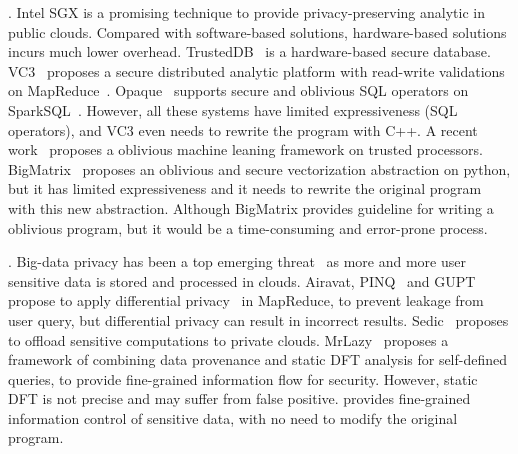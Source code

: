 . Intel SGX is a promising technique 
to provide privacy-preserving analytic in public clouds. Compared with 
software-based solutions, hardware-based solutions incurs much lower overhead. 
TrustedDB~\cite{trusteddb:sigmod11} is a hardware-based secure database.
VC3~\cite{vc3:sp15} proposes a secure distributed analytic platform
with read-write validations on MapReduce~\cite{mapreduce}. 
Opaque~\cite{opaque:nsdi17} supports secure and oblivious SQL operators on 
SparkSQL~\cite{sparksql:sigmod15}. However, all these systems have limited 
expressiveness (\eg SQL operators), and VC3 even needs to rewrite the program 
with C++. A recent work~\cite{oblivious:security16} proposes a oblivious 
machine leaning framework on trusted processors. 
BigMatrix~\cite{bigmatrix:ccs17} proposes an oblivious and secure vectorization
abstraction on python, but it has limited expressiveness and it needs to
rewrite the original program with this new abstraction. Although BigMatrix 
provides guideline for writing a oblivious program, but it would be a 
time-consuming and error-prone process.


. Big-data privacy has been a top 
emerging threat~\cite{top-threats-nine, kazim2015survey} as more and more user 
sensitive data is stored and processed in clouds. 
Airavat\cite{airavat:nsdi10}, PINQ~\cite{pinq:sigmod09} and 
GUPT~\cite{gupt:sigmod12} propose to apply differential 
privacy~\cite{noise:tcc06,differential:focs07} in MapReduce,
to prevent leakage from user query, but differential privacy can result in 
incorrect results. Sedic~\cite{sedic:cloud13} proposes to offload sensitive 
computations to private clouds. MrLazy~\cite{hotcloud14:mrlazy}
proposes a framework of combining data provenance and static DFT analysis for 
self-defined queries, to provide fine-grained information flow for security. 
However, static DFT is not precise and may suffer from false positive. \kakute 
provides fine-grained information control of sensitive data, with no need to 
modify the original program.

